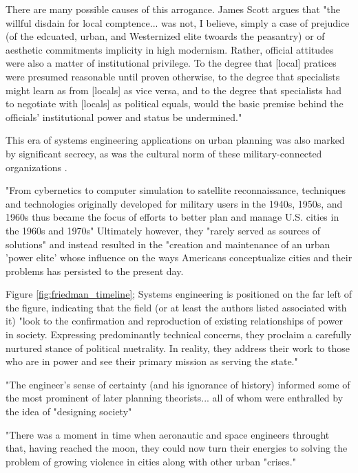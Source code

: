 There are many possible causes of this arrogance. James Scott argues that "the willful disdain for local comptence... was not, I believe, simply a case of prejudice (of the edcuated, urban, and Westernized elite twoards the peasantry) or of aesthetic commitments implicity in high modernism. Rather, official attitudes were also a matter of institutional privilege. To the degree that [local] pratices were presumed reasonable until proven otherwise, to the degree that specialists might learn as from [locals] as vice versa, and to the degree that specialists had to negotiate with [locals] as political equals, would the basic premise behind the officials' institutional power and status be undermined." \cite{scottSeeingStateHow2020}


This era of systems engineering applications on urban planning was also marked by significant secrecy, as was the cultural norm of these military-connected organizations \cite{lightWarfareWelfareDefense2005}.

"From cybernetics to computer simulation to satellite reconnaissance, techniques and technologies originally developed for military users in the 1940s, 1950s, and 1960s thus became the focus of efforts to better plan and manage U.S. cities in the 1960s and 1970s" Ultimately however, they "rarely served as sources of solutions" and instead resulted in the "creation and maintenance of an urban 'power elite' whose influence on the ways Americans conceptualize cities and their problems has persisted to the present day. \cite{lightWarfareWelfareDefense2005}

Figure \ref{fig:friedman_timeline}; Systems engineering is positioned on the far left of the figure, indicating that the field (or at least the authors listed associated with it) "look to the confirmation and reproduction of existing relationships of power in society. Expressing predominantly technical concerns, they proclaim a carefully nurtured stance of political nuetrality. In reality, they address their work to those who are in power and see their primary mission as serving the state." \cite{mazza2017}

"The engineer's sense of certainty (and his ignorance of history) informed some of the most prominent of later planning theorists... all of whom were enthralled by the idea of "designing society" \cite{mazza2017}

"There was a moment in time when aeronautic and space engineers throught that, having reached the moon, they could now turn their energies to solving the problem of growing violence in cities along with other urban "crises." \cite{mazza2017}

